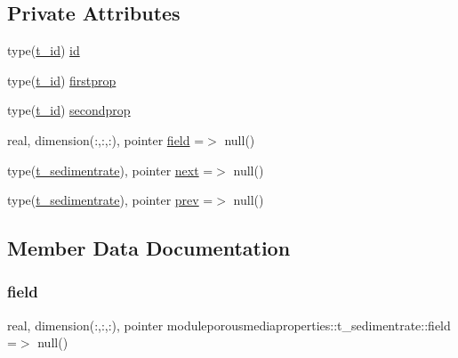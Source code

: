 \subsection*{Private Attributes}
\begin{DoxyCompactItemize}
\item 
type(\mbox{\hyperlink{structmoduleporousmediaproperties_1_1t__id}{t\+\_\+id}}) \mbox{\hyperlink{structmoduleporousmediaproperties_1_1t__sedimentrate_aa0ebc175b2504e4879dbb4845f52c589}{id}}
\item 
type(\mbox{\hyperlink{structmoduleporousmediaproperties_1_1t__id}{t\+\_\+id}}) \mbox{\hyperlink{structmoduleporousmediaproperties_1_1t__sedimentrate_abd413d066597eb45d85d18171d2b2f6c}{firstprop}}
\item 
type(\mbox{\hyperlink{structmoduleporousmediaproperties_1_1t__id}{t\+\_\+id}}) \mbox{\hyperlink{structmoduleporousmediaproperties_1_1t__sedimentrate_a1cc55ce1b4cce0b55949030726dfddbb}{secondprop}}
\item 
real, dimension(\+:,\+:,\+:), pointer \mbox{\hyperlink{structmoduleporousmediaproperties_1_1t__sedimentrate_aff9252250375900f31859d1aefba3edf}{field}} =$>$ null()
\item 
type(\mbox{\hyperlink{structmoduleporousmediaproperties_1_1t__sedimentrate}{t\+\_\+sedimentrate}}), pointer \mbox{\hyperlink{structmoduleporousmediaproperties_1_1t__sedimentrate_a2ec34de3f4d082878e687be1e517a10f}{next}} =$>$ null()
\item 
type(\mbox{\hyperlink{structmoduleporousmediaproperties_1_1t__sedimentrate}{t\+\_\+sedimentrate}}), pointer \mbox{\hyperlink{structmoduleporousmediaproperties_1_1t__sedimentrate_adfeca96be5c6ab2640a6a7442a408044}{prev}} =$>$ null()
\end{DoxyCompactItemize}


\subsection{Member Data Documentation}
\mbox{\label{structmoduleporousmediaproperties_1_1t__sedimentrate_aff9252250375900f31859d1aefba3edf}} 
\subsubsection{\texorpdfstring{field}{field}}
{\footnotesize\ttfamily real, dimension(\+:,\+:,\+:), pointer moduleporousmediaproperties\+::t\+\_\+sedimentrate\+::field =$>$ null()\hspace{0.3cm}{\ttfamily [private]}}

